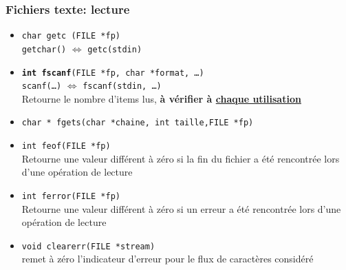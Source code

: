 \documentclass[table,handout,tikz,12pt,svgnames]{beamer}
\begin{document}
\begin{frame}[fragile=singleslide]
	\frametitle{Fichiers texte: lecture}
	\vspace{-0.8cm}
	\begin{block}{}
		\begin{itemize}

			\item \texttt{char getc (FILE *fp)} \\
			\hspace{1cm} \footnotesize{\texttt{getchar()} $\Leftrightarrow$ \texttt{getc(stdin)}}

			\item \normalsize \texttt{\textbf{int fscanf}(FILE *fp, char *format, \ldots)} \\
			\hspace{1cm}\footnotesize \texttt{scanf(\ldots)} $\Leftrightarrow$ \texttt{fscanf(stdin, \ldots)} \\
			\footnotesize Retourne le nombre d'items lus, \textbf{à vérifier à \underline{chaque utilisation}}

			
			\item \small \texttt{char * fgets(char *chaine, int taille,FILE *fp)} \\
			\item \texttt{int feof(FILE *fp)} \\
				\footnotesize Retourne une valeur différent à zéro si la fin du fichier a été rencontrée lors d'une opération de lecture
			\item \texttt{int ferror(FILE *fp)} \\
				\footnotesize Retourne une valeur différent à zéro si un erreur a été rencontrée lors d'une opération de lecture
			 \item \texttt{void clearerr(FILE *stream)} \\ remet à zéro l'indicateur d'erreur pour le flux de caractères considéré
		\end{itemize}
	\end{block}
\end{frame}
\end{document}
